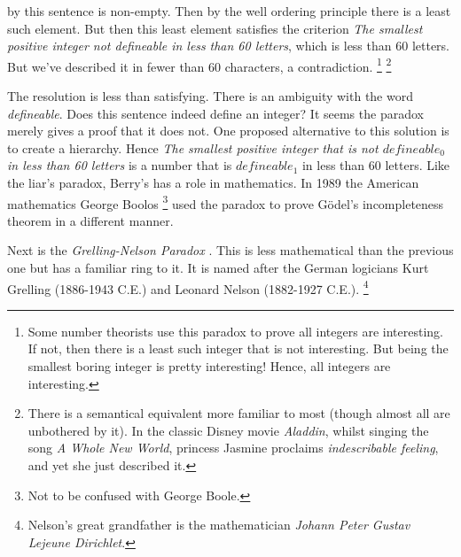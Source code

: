         by this sentence is non-empty. Then by the well ordering principle there
        is a least such element. But then this least element satisfies the
        criterion \textit{The smallest positive integer not defineable in less}
        \textit{than 60 letters}, which is less than 60 letters. But we've
        described it in fewer than 60 characters, a contradiction.%
        \footnote{%
            Some number theorists use this paradox to prove all integers are
            interesting. If not, then there is a least such integer that is
            not interesting. But being the smallest boring integer is pretty
            interesting! Hence, all integers are interesting.%
        }
        \footnote{%
            There is a semantical equivalent more familiar to most (though
            almost all are unbothered by it). In the classic Disney movie
            \textit{Aladdin}, whilst singing the song
            \textit{A Whole New World}, princess Jasmine proclaims
            \textit{indescribable feeling}, and yet she just described it.
        }
        \par\hfill\par
        The resolution is less than satisfying. There is an ambiguity with
        the word \textit{defineable}. Does this sentence indeed define an
        integer? It seems the paradox merely gives a proof that it does not. One
        proposed alternative to this solution is to create a hierarchy. Hence
        \textit{The smallest positive integer that is not $defineable_{0}$}
        \textit{in less than 60 letters} is a number that is $defineable_{1}$ in
        less than 60 letters. Like the liar's paradox, Berry's has a role in
        mathematics. In 1989 the American mathematics George
        Boolos%
        \footnote{Not to be confused with George Boole.}
        used the paradox to prove G\"{o}del's incompleteness theorem in a
        different manner.
        \par\hfill\par
        Next is the \textit{Grelling-Nelson Paradox}%
        . This is
        less mathematical than the previous one but has a familiar ring to it.
        It is named after the German logicians Kurt
        Grelling (1886-1943 C.E.) and Leonard
        Nelson (1882-1927 C.E.).%
        \footnote{%
            Nelson's great grandfather is the mathematician
            \textit{Johann Peter Gustav Lejeune Dirichlet}.%
        }
